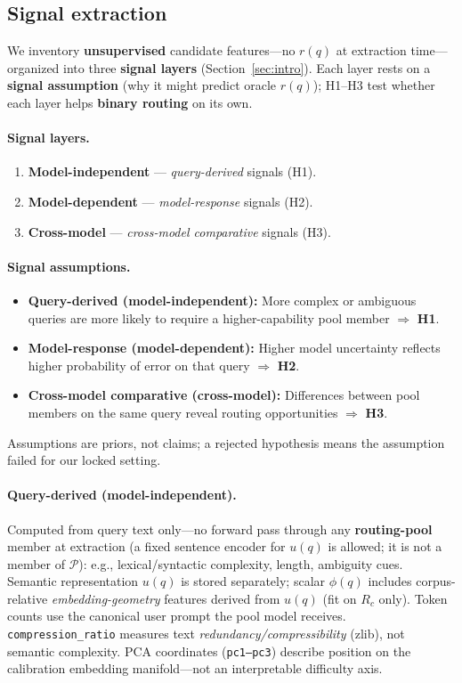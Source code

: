 \subsection{Signal extraction}
\label{sec:signal-extraction}

We inventory \textbf{unsupervised} candidate features---no $r(q)$ at extraction time---organized into three \textbf{signal layers} (Section~\ref{sec:intro}).
Each layer rests on a \textbf{signal assumption} (why it might predict oracle $r(q)$); H1--H3 test whether each layer helps \textbf{binary routing} on its own.

\paragraph{Signal layers.}
\begin{enumerate}
  \item \textbf{Model-independent} --- \emph{query-derived} signals (H1).
  \item \textbf{Model-dependent} --- \emph{model-response} signals (H2).
  \item \textbf{Cross-model} --- \emph{cross-model comparative} signals (H3).
\end{enumerate}

\paragraph{Signal assumptions.}
\begin{itemize}
  \item \textbf{Query-derived (model-independent):} More complex or ambiguous queries are more likely to require a higher-capability pool member $\Rightarrow$ \textbf{H1}.
  \item \textbf{Model-response (model-dependent):} Higher model uncertainty reflects higher probability of error on that query $\Rightarrow$ \textbf{H2}.
  \item \textbf{Cross-model comparative (cross-model):} Differences between pool members on the same query reveal routing opportunities $\Rightarrow$ \textbf{H3}.
\end{itemize}
Assumptions are priors, not claims; a rejected hypothesis means the assumption failed for our locked setting.

\paragraph{Query-derived (model-independent).}
Computed from query text only---no forward pass through any \textbf{routing-pool} member at extraction (a fixed sentence encoder for $u(q)$ is allowed; it is not a member of $\mathcal{P}$): e.g., lexical/syntactic complexity, length, ambiguity cues.
Semantic representation $u(q)$ is stored separately; scalar $\phi(q)$ includes corpus-relative \emph{embedding-geometry} features derived from $u(q)$ (fit on $R_c$ only).
Token counts use the canonical user prompt the pool model receives.
\texttt{compression\_ratio} measures text \emph{redundancy/compressibility} (zlib), not semantic complexity.
PCA coordinates (\texttt{pc1--pc3}) describe position on the calibration embedding manifold---not an interpretable difficulty axis.

